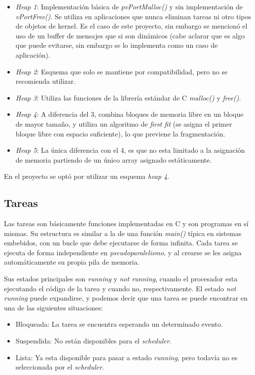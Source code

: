 \documentclass{IEEEtran}
\begin{document}
\begin{itemize}
    \item \textit{Heap 1}: Implementación básica de \textit{pvPortMalloc()} y sin implementación de \textit{vPortFree()}. Se utiliza en aplicaciones que nunca eliminan tareas ni otro tipos de objetos de kernel. Es el caso de este proyecto, sin embargo se mencionó el uso de un buffer de mensajes que si son dinámicos (cabe aclarar que es algo que puede evitarse, sin embargo se lo implementa como un caso de aplicación).
    \item \textit{Heap 2}: Esquema que solo se mantiene por compatibilidad, pero no se recomienda utilizar.
    \item \textit{Heap 3}: Utiliza las funciones de la librería estándar de C \textit{malloc()} y \textit{free()}.
    \item \textit{Heap 4}: A diferencia del 3, combina bloques de memoria libre en un bloque de mayor tamaño, y utiliza un algoritmo de \textit{first fit} (se asigna el primer bloque libre con espacio suficiente), lo que previene la fragmentación.
    \item \textit{Heap 5}: La única diferencia con el 4, es que no esta limitado a la asignación de memoria partiendo de un único array asignado estáticamente.
\end{itemize}

En el proyecto se optó por utilizar un esquema \textit{heap 4}.

\subsection{Tareas}
Las tareas son básicamente funciones implementadas en C y son programas en sí mismas. Su estructura es similar a la de una función \textit{main()} típica en sistemas embebidos, con un bucle que debe ejecutarse de forma infinita. Cada tarea se ejecuta de forma independiente en \textit{pseudoparalelismo}, y al crearse se les asigna automáticamente su propia pila de memoria.

Sus estados principales son \textit{running} y \textit{not running}, cuando el procesador esta ejecutando el código de la tarea y cuando no, respectivamente. El estado \textit{not running} puede expandirse, y podemos decir que una tarea se puede encontrar en una de las siguientes situaciones:

\begin{itemize}
    \item Bloqueada: La tarea se encuentra esperando un determinado evento.
    \item Suspendida: No están disponibles para el \textit{scheduler}.
    \item Lista: Ya esta disponible para pasar a estado \textit{running}, pero todavía no es seleccionada por el \textit{scheduler}.
\end{itemize}
\end{document}
